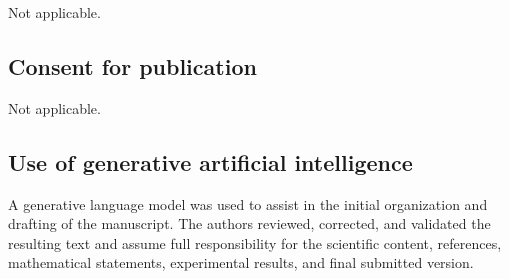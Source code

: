 \documentclass[pdflatex,sn-mathphys-num,iicol,oneside]{sn-jnl}
\begin{document}
Not applicable.

\subsection*{Consent for publication}

Not applicable.

\subsection*{Use of generative artificial intelligence}

A generative language model was used to assist in the initial
organization and drafting of the manuscript. The authors reviewed,
corrected, and validated the resulting text and assume full
responsibility for the scientific content, references, mathematical
statements, experimental results, and final submitted version.


\end{document}
